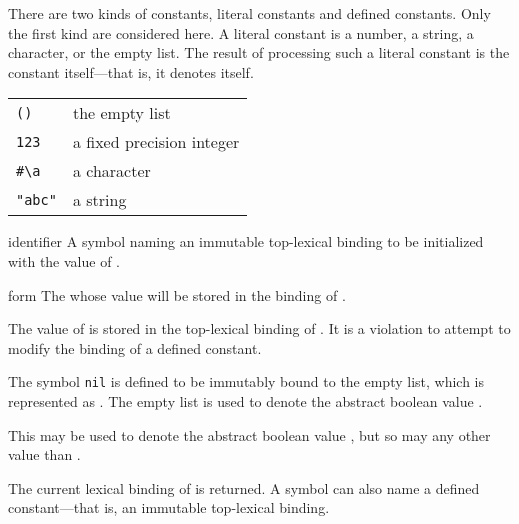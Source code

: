 \begin{optDefinition}
\noindent
%
\noindent
There are two kinds of constants, literal
constants and defined constants.  Only the
first kind are considered here.  A literal constant is a number, a string, a
character, or the empty list.  The result of processing such a literal constant
is the constant itself---that is, it denotes
itself.
%
\examples
\begin{tabular}{ll}
    \verb+()+ & the empty list\\
    \verb+123+ & a fixed precision integer\\
    \verb+#\a+ & a character\\
    \verb+"abc"+ & a string
\end{tabular}

%
\Syntax
{}%
%
\begin{arguments}
    \item[identifier] A symbol naming an immutable top-lexical binding to be
    initialized with the value of .

    \item[form] The  whose value will be stored in the binding of
    .
\end{arguments}
%
\remarks%
The value of  is stored in the top-lexical binding of .
It is a violation to attempt to modify the binding of a defined constant.

%
\remarks%
The symbol {\tt nil} is defined to be immutably bound to the empty list, which
is represented as \nil{}.  The empty list is used to denote the abstract boolean
value .

%
\remarks%
This may be used to denote the abstract boolean value , but so may any
other value than \nil{}.

\noindent
The current lexical binding of  is
returned.  A symbol can also name a defined
constant---that is, an immutable top-lexical binding.


\end{optDefinition}
